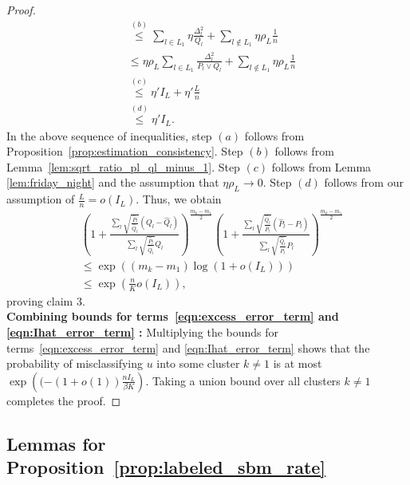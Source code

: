 \documentclass{article}
\begin{document}
\begin{proof}
\begin{align*}
%
&\stackrel{(b)} \leq \sum_{l \in L_1} \eta \frac{\Delta_l^2}{Q_l} + \sum_{l \notin L_1} \eta \rho_L \frac{1}{n} \\
%
&\leq \eta \rho_L \sum_{l \in L_1} \frac{\Delta_l^2}{P_l \vee Q_l} + \sum_{l \notin L_1} \eta \rho_L \frac{1}{n} \\
%
& \stackrel{(c)} \leq \eta' I_L + \eta' \frac{L}{n}  \\
%
&\stackrel{(d)}  \leq \eta' I_L.  
\end{align*}
In the above sequence of inequalities, step $(a)$ follows from Proposition~\ref{prop:estimation_consistency}. Step $(b)$ follows from Lemma~\ref{lem:sqrt_ratio_pl_ql_minus_1}. Step $(c)$ follows from Lemma \ref{lem:friday_night} and the assumption that $\eta \rho_L \to 0$. Step $(d)$ follows from our assumption of $\frac{L}{n} = o(I_L)$. Thus, we obtain
\begin{align*}
& \left( 1 + 
   \frac{\sum_l \sqrt{\frac{\hat{P}_l}{\hat{Q}_l}} (Q_l - \hat{Q}_l)}
        {\sum_l \sqrt{\frac{\hat{P}_l}{\hat{Q}_l}} \hat{Q}_l} 
     \right)^{\frac{m_k - m_1}{2}} 
   \left( 1+ \frac{\sum_l \sqrt{\frac{\hat{Q}_l}{\hat{P}_l}} (\hat{P}_l - P_l)}
         {\sum_l \sqrt{\frac{\hat{Q}_l}{\hat{P}_l}} P_l } \right)^{\frac{m_k - m_1}{2}} 
\\
&\leq \exp\left( (m_k - m_1) \log(1 + o(I_L) ) \right) \\
&\leq \exp \left( \frac{n}{K} o(I_L) \right) ,
\end{align*}
proving claim 3.\\

\noindent \textbf{Combining bounds for  terms~\ref{eqn:excess_error_term} and \ref{eqn:Ihat_error_term} :}  Multiplying the bounds for terms~\ref{eqn:excess_error_term} and \ref{eqn:Ihat_error_term} shows that the probability of misclassifying $u$ into some cluster $k \neq 1$ is at most $\exp\left(( - (1 + o(1)) \frac{nI_L}{\beta K} \right)$. Taking a union bound over all clusters $k \neq 1$ completes the proof.
\end{proof}


\subsection{Lemmas for Proposition~\ref{prop:labeled_sbm_rate}}
\label{appendix: lemmas for labeled_sbm_rate}
\end{document}
